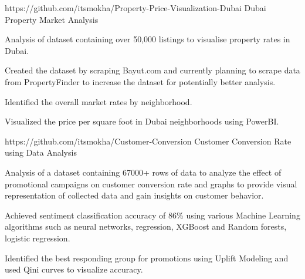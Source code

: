 

\begin{cventries}

  \cventry
    {https://github.com/itsmokha/Property-Price-Visualization-Dubai} %
    {Dubai Property Market Analysis} %
    {}
    {}
    {
      \begin{cvitems} %
		\item Analysis of dataset containing over 50,000 listings to visualise property rates in Dubai.
		\item Created the dataset by scraping Bayut.com and currently planning to scrape data from PropertyFinder to increase the dataset for potentially better analysis. 
		\item Identified the overall market rates by neighborhood.
		\item Visualized the price per square foot in Dubai neighborhoods using PowerBI.
      \end{cvitems}
    }

  \cventry
    {https://github.com/itsmokha/Customer-Conversion} %
    {Customer Conversion Rate using Data Analysis} %
    {}
    {}
    {
      \begin{cvitems} %
		\item Analysis of a dataset containing 67000+ rows of data to analyze the effect of promotional campaigns on customer conversion rate  and graphs to provide visual representation of collected data and gain insights on customer behavior.
		\item Achieved sentiment classification accuracy of 86\% using various Machine Learning algorithms such as neural networks, regression, XGBoost and Random forests, logistic regression.
		\item Identified the best responding group for promotions using Uplift Modeling and used Qini curves to visualize accuracy.
      \end{cvitems}
    }


\end{cventries}
